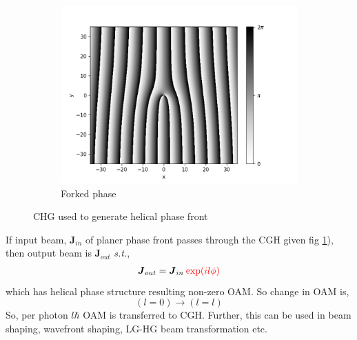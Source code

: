 \documentclass[11pt,a4paper]{article}
\numberwithin{equation}{section}
\begin{document}
\begin{figure}[H]
\begin{subfigure}[H]{0.31\textwidth}
		\includegraphics[width=\textwidth]{cgh_mixed.png}
		\caption{Forked phase}
		\label{fig:cgh,mixed}
	\end{subfigure}
	\caption{CHG used to generate helical phase front}
	\label{fig:CGH}
\end{figure}

If input beam, $\boldsymbol{J}_{in}$ of planer phase front passes through the CGH given fig \ref{fig:cgh,mixed}), then output beam is $\boldsymbol{J}_{out}$ \textit{s.t.},
\begin{align}
	\boldsymbol{J}_{out}=\boldsymbol{J}_{in}\:{\color{red} \exp(il\phi)}
\end{align}
which has helical phase structure resulting non-zero OAM. So change in OAM is,
$$(l=0)\longrightarrow (l=l)$$
So, per photon $l\hbar$ OAM is transferred to CGH. Further, this can be used in beam shaping, wavefront shaping, LG-HG beam transformation etc. \cite{yao 11}\cite{allen 99}




\clearpage
\let\oldbibliography\thebibliography
\renewcommand{\thebibliography}[1]{%
	\oldbibliography{#1}%
	\setlength{\itemsep}{0pt}%
}
\small
{}\selectfont
\end{document}
